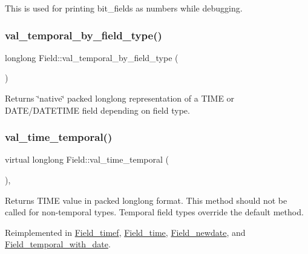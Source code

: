 This is used for printing bit\+\_\+fields as numbers while debugging. \mbox{\label{classField_a8317ba4d14c4ca783bfd657fc64070a3}} 
\subsubsection{\texorpdfstring{val\+\_\+temporal\+\_\+by\+\_\+field\+\_\+type()}{val\_temporal\_by\_field\_type()}}
{\footnotesize\ttfamily longlong Field\+::val\+\_\+temporal\+\_\+by\+\_\+field\+\_\+type (\begin{DoxyParamCaption}{ }\end{DoxyParamCaption})\hspace{0.3cm}{\ttfamily [inline]}}

Returns \char`\"{}native\char`\"{} packed longlong representation of a T\+I\+ME or D\+A\+T\+E/\+D\+A\+T\+E\+T\+I\+ME field depending on field type. \mbox{\label{classField_a504ae8be08face4684852eaa79734158}} 
\subsubsection{\texorpdfstring{val\+\_\+time\+\_\+temporal()}{val\_time\_temporal()}}
{\footnotesize\ttfamily virtual longlong Field\+::val\+\_\+time\+\_\+temporal (\begin{DoxyParamCaption}{ }\end{DoxyParamCaption})\hspace{0.3cm}{\ttfamily [inline]}, {\ttfamily [virtual]}}

Returns T\+I\+ME value in packed longlong format. This method should not be called for non-\/temporal types. Temporal field types override the default method. 

Reimplemented in \mbox{\hyperlink{classField__timef_a03db4df3722b7e0292b84b982de342e3}{Field\+\_\+timef}}, \mbox{\hyperlink{classField__time_a7e15eb097b1cfacdabfa92de7dc3e8ed}{Field\+\_\+time}}, \mbox{\hyperlink{classField__newdate_aad085aaff8fef3367986f9733b79605c}{Field\+\_\+newdate}}, and \mbox{\hyperlink{classField__temporal__with__date_acf8330ac7e19ae7bdf978fc811e49c00}{Field\+\_\+temporal\+\_\+with\+\_\+date}}.

